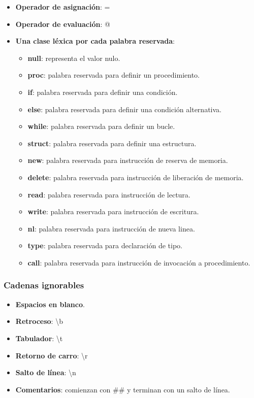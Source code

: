 \documentclass[11pt]{article}
\begin{document}
\begin{itemize}
\begin{itemize}
            \end{itemize}
            \item \textbf{Operador de asignación}: =
            \item \textbf{Operador de evaluación}: @
            \item \textbf{Una clase léxica por cada palabra reservada}:
                \begin{itemize}
                    \item \textbf{null}: representa el valor nulo.
                    \item \textbf{proc}: palabra reservada para definir un procedimiento.
                    \item \textbf{if}: palabra reservada para definir una condición.
                    \item \textbf{else}: palabra reservada para definir una condición alternativa.
                    \item \textbf{while}: palabra reservada para definir un bucle.
                    \item \textbf{struct}: palabra reservada para definir una estructura.
                    \item \textbf{new}: palabra reservada para instrucción de reserva de memoria.
                    \item \textbf{delete}: palabra reservada para instrucción de liberación de memoria.
                    \item \textbf{read}: palabra reservada para instrucción de lectura.
                    \item \textbf{write}: palabra reservada para instrucción de escritura.
                    \item \textbf{nl}: palabra reservada para instrucción de nueva linea.
                    \item \textbf{type}: palabra reservada para declaración de tipo.
                    \item \textbf{call}: palabra reservada para instrucción de invocación a procedimiento.
                \end{itemize}
        \end{itemize}
        \subsubsection*{Cadenas ignorables}
        \begin{itemize}
            \item \textbf{Espacios en blanco}.
            \item \textbf{Retroceso}: \textbackslash b
            \item \textbf{Tabulador}: \textbackslash t
            \item \textbf{Retorno de carro}: \textbackslash r
            \item \textbf{Salto de línea}: \textbackslash n
            \item \textbf{Comentarios}: comienzan con \#\# y terminan con un salto de línea.
        \end{itemize}
\end{document}

